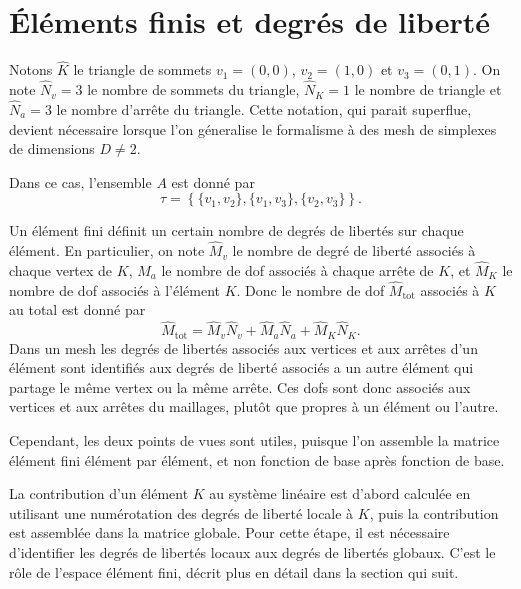 \section{\'El\'ements finis et degr\'es de libert\'e}
Notons $\hat K$ le triangle de sommets $v_1 = (0,0)$, $v_2 = (1,0)$ et
$v_3 = (0, 1)$. On note $\hat N_v = 3$ le nombre de sommets du
triangle, $\hat N_K = 1$ le nombre de triangle et $\hat N_a = 3$ le
nombre d'arr\^ete du triangle. Cette notation, qui parait superflue,
devient n\'ecessaire lorsque l'on g\'eneralise le formalisme \`a des
mesh de simplexes de dimensions $D \neq 2$.

Dans ce cas, l'ensemble $A$ est donn\'e par 
\begin{equation}
  \tau = \left\{ \{v_1, v_2\}, \{v_1, v_3\}, \{v_2, v_3\} \right\}.
\end{equation}

Un \'el\'ement fini d\'efinit un certain nombre de degr\'es de
libert\'es sur chaque \'el\'ement. En particulier, on note $\hat M_v$ le
nombre de degr\'e de libert\'e associ\'es \`a chaque vertex de $K$,
$\hat M_a$ le nombre de dof associ\'es \`a chaque arr\^ete de $K$, et
$\hat M_K$ le nombre de dof associ\'es \`a l'\'el\'ement $K$. Donc le
nombre de dof $\hat M_\text{tot}$ associ\'es \`a $K$ au total est donn\'e par 
\begin{equation}
  \hat M_\text{tot} = \hat M_v \hat N_v + \hat M_a \hat N_a + \hat M_K \hat N_K.
\end{equation}
Dans un mesh les degr\'es de libert\'es associ\'es aux vertices et aux
arr\^etes d'un \'el\'ement sont identifi\'es aux degr\'es de libert\'e
associ\'es a un autre \'el\'ement qui partage le m\^eme vertex ou la
m\^eme arr\^ete. Ces dofs sont donc associ\'es aux vertices et aux
arr\^etes du maillages, plut\^ot que propres \`a un \'el\'ement ou
l'autre.

Cependant, les deux points de vues sont utiles, puisque l'on assemble
la matrice \'el\'ement fini \'el\'ement par \'el\'ement, et non fonction de
base apr\`es fonction de base.

La contribution d'un \'el\'ement $K$ au syst\`eme lin\'eaire est d'abord
calcul\'ee en utilisant une num\'erotation des degr\'es de libert\'e
locale \`a $K$, puis la contribution est assembl\'ee dans la matrice
globale. Pour cette \'etape, il est n\'ecessaire d'identifier les
degr\'es de libert\'es locaux aux degr\'es de libert\'es globaux. C'est
le r\^ole de l'espace \'el\'ement fini, d\'ecrit plus en d\'etail dans
la section qui suit.

